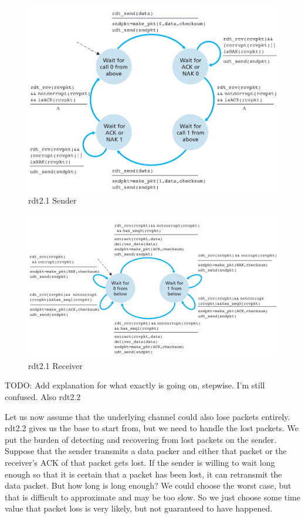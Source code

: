 \documentclass[12pt,letterpaper]{article}
\theoremstyle{definition}
\begin{document}
\begin{figure}[htpb]
  \centering
  \includegraphics[width=0.8\linewidth]{./assets/rdt2-1_sender.png}
  \caption{rdt2.1 Sender}%
  \label{fig:name}
\end{figure}

\begin{figure}[htpb]
  \centering
  \includegraphics[width=0.8\linewidth]{./assets/rdt2-1_rcvr.png}
  \caption{rdt2.1 Receiver}%
  \label{fig:./assets}
\end{figure}

TODO: Add explanation for what exactly is going on, stepwise. I'm still confused. Also rdt2.2

Let us now assume that the underlying channel could also lose packets entirely. rdt2.2 gives us the base to start from, but we need to handle the lost packets. We put the burden of detecting and recovering from lost packets on the sender. Suppose that the sender transmits a data packer and either that packet or the receiver's ACK of that packet gets lost. If the sender is willing to wait long enough so that it is certain that a packet has been lost, it can retransmit the data packet. But how long is long enough? We could choose the worst case, but that is difficult to approximate and may be too slow. So we just choose some time value that packet loss is very likely, but not guaranteed to have happened.
\end{document}
